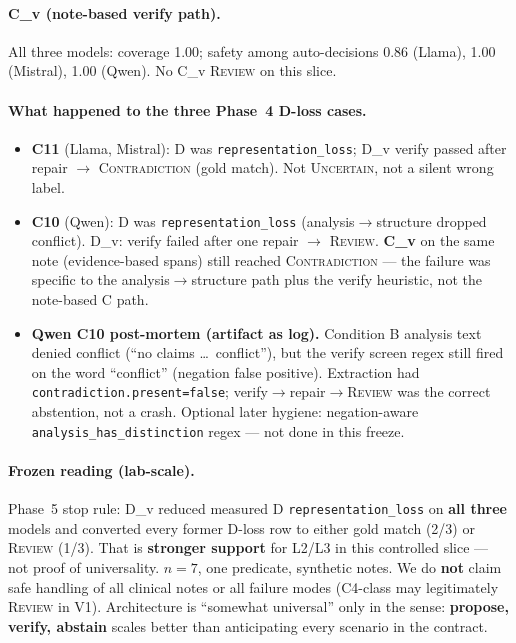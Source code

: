 \documentclass[11pt,a4paper]{article}
\newcommand{\unc}{\textsc{Uncertain}}
\newcommand{\con}{\textsc{Contradiction}}
\newcommand{\rev}{\textsc{Review}}
\begin{document}
\paragraph{C\_v (note-based verify path).}
All three models: coverage 1.00; safety among auto-decisions 0.86 (Llama), 1.00 (Mistral), 1.00 (Qwen).
No C\_v \rev{} on this slice.

\paragraph{What happened to the three Phase~4 D-loss cases.}
\begin{itemize}
  \item \textbf{C11} (Llama, Mistral): D was \texttt{representation\_loss}; D\_v verify passed after repair $\rightarrow$ \con{} (gold match). Not \unc{}, not a silent wrong label.
  \item \textbf{C10} (Qwen): D was \texttt{representation\_loss} (analysis$\rightarrow$structure dropped conflict). D\_v: verify failed after one repair $\rightarrow$ \rev{}. \textbf{C\_v} on the same note (evidence-based spans) still reached \con{} --- the failure was specific to the analysis$\rightarrow$structure path plus the verify heuristic, not the note-based C path.
  \item \textbf{Qwen C10 post-mortem (artifact as log).}
        Condition B analysis text denied conflict (``no claims \ldots\ conflict''), but the verify screen regex still fired on the word ``conflict'' (negation false positive).
        Extraction had \texttt{contradiction.present=false}; verify$\rightarrow$repair$\rightarrow$\rev{} was the correct abstention, not a crash.
        Optional later hygiene: negation-aware \texttt{analysis\_has\_distinction} regex --- not done in this freeze.
\end{itemize}

\paragraph{Frozen reading (lab-scale).}
Phase~5 stop rule: D\_v reduced measured D \texttt{representation\_loss} on \textbf{all three} models and converted every former D-loss row to either gold match (2/3) or \rev{} (1/3).
That is \textbf{stronger support} for L2/L3 in this controlled slice --- not proof of universality.
$n=7$, one predicate, synthetic notes.
We do \textbf{not} claim safe handling of all clinical notes or all failure modes (C4-class may legitimately \rev{} in V1).
Architecture is ``somewhat universal'' only in the sense: \textbf{propose, verify, abstain} scales better than anticipating every scenario in the contract.
\end{document}
